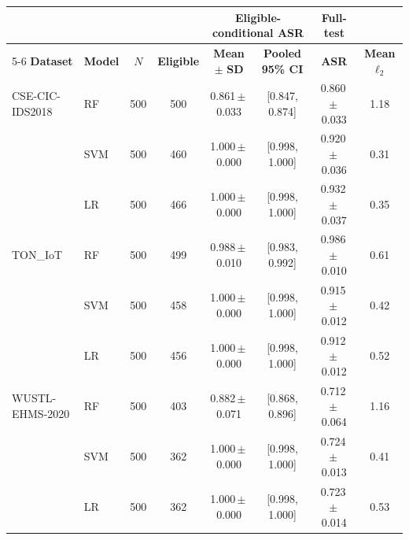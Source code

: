 \begin{tabular}{l l c c c c c c}
\toprule
& & & & \multicolumn{2}{c}{\textbf{Eligible-conditional ASR}} & \textbf{Full-test} & \\
\cmidrule(lr){5-6}
\textbf{Dataset} & \textbf{Model} & $N$ & \textbf{Eligible} & \textbf{Mean} $\pm$ \textbf{SD} & \textbf{Pooled 95\% CI} & \textbf{ASR} & \textbf{Mean} $\ell_2$ \\
\midrule
CSE-CIC-IDS2018 & RF & 500 & 500 & 0.861\,$\pm$\,0.033 & [0.847, 0.874] & 0.860\,$\pm$\,0.033 & 1.18 \\
 & SVM & 500 & 460 & 1.000\,$\pm$\,0.000 & [0.998, 1.000] & 0.920\,$\pm$\,0.036 & 0.31 \\
 & LR & 500 & 466 & 1.000\,$\pm$\,0.000 & [0.998, 1.000] & 0.932\,$\pm$\,0.037 & 0.35 \\
TON\_IoT & RF & 500 & 499 & 0.988\,$\pm$\,0.010 & [0.983, 0.992] & 0.986\,$\pm$\,0.010 & 0.61 \\
 & SVM & 500 & 458 & 1.000\,$\pm$\,0.000 & [0.998, 1.000] & 0.915\,$\pm$\,0.012 & 0.42 \\
 & LR & 500 & 456 & 1.000\,$\pm$\,0.000 & [0.998, 1.000] & 0.912\,$\pm$\,0.012 & 0.52 \\
WUSTL-EHMS-2020 & RF & 500 & 403 & 0.882\,$\pm$\,0.071 & [0.868, 0.896] & 0.712\,$\pm$\,0.064 & 1.16 \\
 & SVM & 500 & 362 & 1.000\,$\pm$\,0.000 & [0.998, 1.000] & 0.724\,$\pm$\,0.013 & 0.41 \\
 & LR & 500 & 362 & 1.000\,$\pm$\,0.000 & [0.998, 1.000] & 0.723\,$\pm$\,0.014 & 0.53 \\
\bottomrule
\end{tabular}
